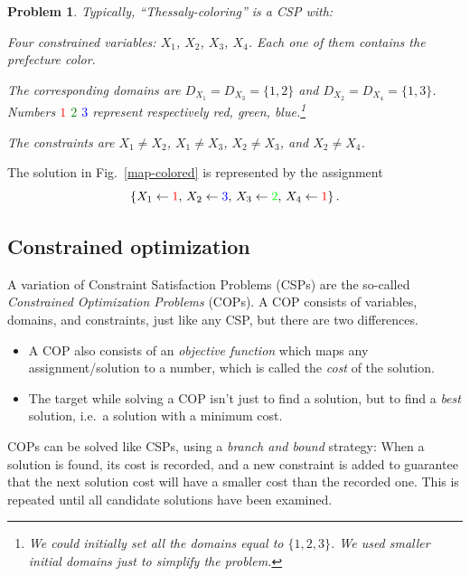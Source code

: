 \documentclass{ws-ijait}
\newtheorem{problem}{Problem}
\begin{document}
\begin{problem}
  \label{thessaly-coloring}
  Typically, \emph{``Thessaly-coloring''} is a CSP with:
  \begin{romanlist}
    \item Four constrained variables: $X_1$, $X_2$, $X_3$,
          $X_4$. Each one of them contains the prefecture
          color.
    \item The corresponding domains are $D_{X_1} = D_{X_3} =
          \{1, 2\}$ and $D_{X_2} = D_{X_4} = \{1, 3\}$.
          Numbers \textcolor{red}{$1$}
          \textcolor{green}{$2$} \textcolor{blue}{$3$}
          represent respectively red, green,
          blue.\footnote{We could initially set all the
          domains equal to $\{1, 2, 3\}$. We used smaller
          initial domains just to simplify the problem.}
    \item The constraints are $X_1 \neq X_2$, $X_1 \neq
          X_3$, $X_2 \neq X_3$, and $X_2 \neq X_4$.
  \end{romanlist}
\end{problem}
The solution in Fig.~\ref{map-colored} is represented by the
assignment
\begin{equation}
  \label{solution}
  \{X_1 \gets \textcolor{red}{1}, \, X_2 \gets
  \textcolor{blue}{3}, \, X_3 \gets \textcolor{green}{2}, \,
  X_4 \gets \textcolor{red}{1}\} \, .
\end{equation}

\subsection{Constrained optimization\label{COP}}

A variation of Constraint Satisfaction Problems (CSPs) are
the so-called \emph{Constrained Optimization Problems}
(COPs). A COP consists of variables, domains, and
constraints, just like any CSP, but there are two
differences.
\begin{itemize}
  \item A COP also consists of an \emph{objective function}
        which maps any assignment\slash solution to a
        number, which is called the \emph{cost} of the
        solution.
  \item The target while solving a COP isn't just to find a
        solution, but to find a \emph{best} solution, i.e.\ 
        a solution with a minimum cost.
\end{itemize}
COPs can be solved like CSPs, using a \emph{branch and
bound} strategy: When a solution is found, its cost is
recorded, and a new constraint is added to guarantee that
the next solution cost will have a smaller cost than the
recorded one. This is repeated until all candidate solutions
have been examined.
\end{document}
